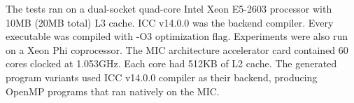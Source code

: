 The tests ran on a dual-socket quad-core Intel Xeon E5-2603 processor with 10MB (20MB total) L3 cache.
ICC v14.0.0 was the backend compiler. Every executable was compiled with -O3 optimization flag. 
Experiments were also run on a Xeon Phi coprocessor. 
The MIC architecture accelerator card contained 60 cores clocked at 1.053GHz. Each core had 512KB of L2 cache. 
The generated program variants used ICC v14.0.0 compiler as their backend, producing OpenMP programs that ran natively on the MIC.
